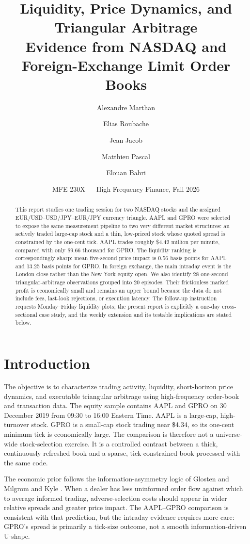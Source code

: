 \documentclass[11pt]{article}
\title{\textbf{Liquidity, Price Dynamics, and Triangular Arbitrage}\\
\large Evidence from NASDAQ and Foreign-Exchange Limit Order Books}
\author{Alexandre Marthan \and Elias Roubache \and Jean Jacob \and Matthieu Pascal \and Elouan Bahri}
\date{MFE 230X --- High-Frequency Finance, Fall 2026}
\begin{document}
\maketitle

\begin{abstract}
This report studies one trading session for two NASDAQ stocks and the assigned EUR/USD--USD/JPY--EUR/JPY currency triangle. AAPL and GPRO were selected to expose the same measurement pipeline to two very different market structures: an actively traded large-cap stock and a thin, low-priced stock whose quoted spread is constrained by the one-cent tick. AAPL trades roughly \$4.42 million per minute, compared with only \$9.66 thousand for GPRO. The liquidity ranking is correspondingly sharp: mean five-second price impact is 0.56 basis points for AAPL and 13.25 basis points for GPRO. In foreign exchange, the main intraday event is the London close rather than the New York equity open. We also identify 28 one-second triangular-arbitrage observations grouped into 20 episodes. Their frictionless marked profit is economically small and remains an upper bound because the data do not include fees, last-look rejections, or execution latency. The follow-up instruction requests Monday--Friday liquidity plots; the present report is explicitly a one-day cross-sectional case study, and the weekly extension and its testable implications are stated below.
\end{abstract}

\section{Introduction}

The objective is to characterize trading activity, liquidity, short-horizon price dynamics, and executable triangular arbitrage using high-frequency order-book and transaction data. The equity sample contains AAPL and GPRO on 30 December 2019 from 09:30 to 16:00 Eastern Time. AAPL is a large-cap, high-turnover stock. GPRO is a small-cap stock trading near \$4.34, so its one-cent minimum tick is economically large. The comparison is therefore not a universe-wide stock-selection exercise. It is a controlled contrast between a thick, continuously refreshed book and a sparse, tick-constrained book processed with the same code.

The economic prior follows the information-asymmetry logic of Glosten and Milgrom \cite{glosten1985} and Kyle \cite{kyle1985}. When a dealer has less uninformed order flow against which to average informed trading, adverse-selection costs should appear in wider relative spreads and greater price impact. The AAPL--GPRO comparison is consistent with that prediction, but the intraday evidence requires more care: GPRO's spread is primarily a tick-size outcome, not a smooth information-driven U-shape.
\end{document}
